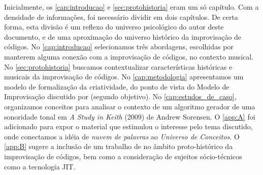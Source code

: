 Inicialmente, os \autoref{cap:introducao} e \autoref{sec:protohistoria} eram um só capítulo. Com a densidade de informações, foi necessário dividir em dois capítulos. De certa forma, esta divisão é um reflexo do universo psicológico do autor deste documento, e de uma aproximação do universo histórico da improvisação de códigos. No \autoref{cap:introducao} selecionamos três abordagens, escolhidas por manterem alguma conexão com a improvisação de códigos, no contexto musical.  No \autoref{sec:protohistoria} buscamos contextualizar características históricas e musicais da improvisação de códigos. No \autoref{cap:metodologia} apresentamos um modelo de formalização da criatividade, do ponto de vista do Modelo de Improvisação discutido por  (segundo objetivo). No \autoref{cap:estudos_de_caso}, organizamos conceitos para analisar o contexto de um algoritmo gerador de uma sonoridade tonal em \emph{A Study in Keith} (2009) de Andrew Sorensen.  O \autoref{app:A} foi adicionado para expor o material que estimulou o interesse pelo tema discutido, onde conectamos a idéia de \emph{nuvem de palavras} ao \emph{Universo de Conceitos}. O \autoref{app:B} sugere a inclusão de um trabalho de  no âmbito proto-histórico da improvisação de códigos, bem como a consideração de sujeitos sócio-técnicos como a tecnologia JIT.